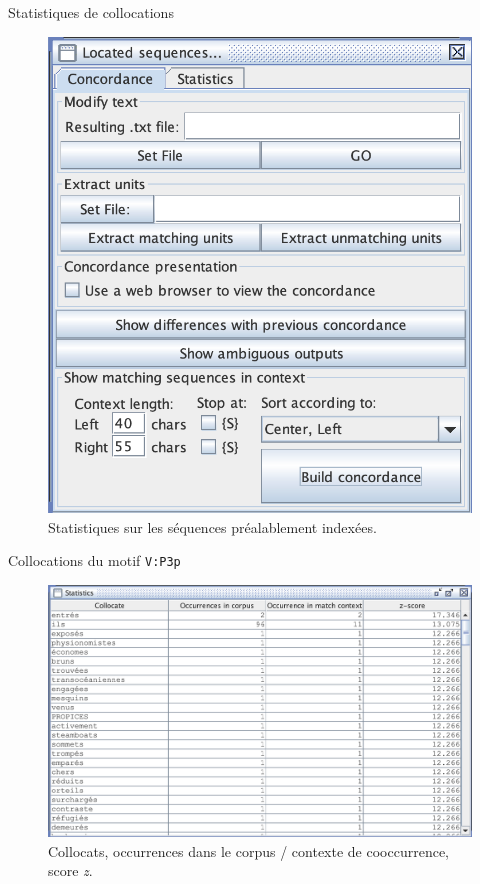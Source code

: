 \documentclass[xetex,xcolor={table,usenames,dvipsnames}]{beamer}
\begin{document}
\begin{frame}{Statistiques de collocations}
	\begin{figure}[h] %
		\centering
		\includegraphics[width=0.6\linewidth]{img/collocations.png}
		\caption{Statistiques sur les séquences préalablement indexées.}
		\label{fig:ling_out_TAL}
	\end{figure}
\end{frame}

\begin{frame}{Collocations du motif \texttt{V:P3p}}
		\begin{figure}[h] %
		\centering
		\includegraphics[width=0.8\linewidth]{img/resultats_collocations.png}
		\caption{Collocats, occurrences dans le corpus / contexte de cooccurrence, score \textit{z}.}
		\label{fig:ling_out_TAL}
	\end{figure}
\end{frame}
\end{document}
